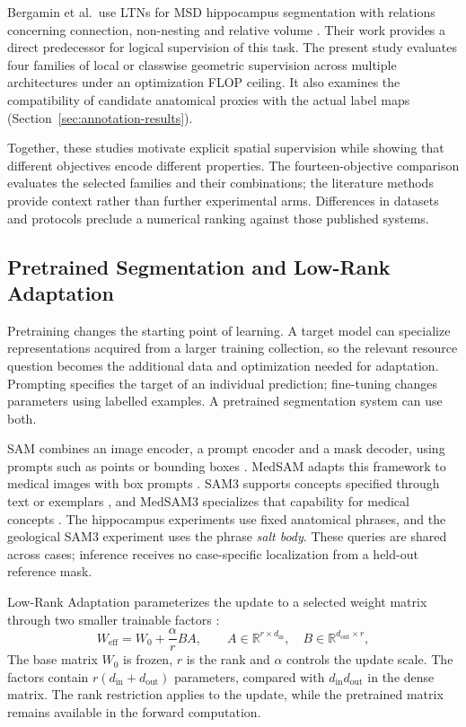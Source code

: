 \documentclass[12pt,a4paper]{article}
\begin{document}
Bergamin et al.\ use LTNs for MSD hippocampus segmentation with relations
concerning connection, non-nesting and relative volume
\cite{bergamin2025integrating}. Their work provides a direct predecessor
for logical supervision of this task. The present study evaluates four
families of local or classwise geometric supervision across multiple
architectures under an optimization FLOP ceiling. It also examines the
compatibility of candidate anatomical proxies with the actual label maps
(Section~\ref{sec:annotation-results}).

Together, these studies motivate explicit spatial supervision while
showing that different objectives encode different properties. The
fourteen-objective comparison evaluates the selected families and their
combinations; the literature methods provide context rather than further
experimental arms. Differences in datasets and protocols preclude a
numerical ranking against those published systems.

\subsection{Pretrained Segmentation and Low-Rank Adaptation}
\label{sec:pretrained-adaptation}

Pretraining changes the starting point of learning. A target model can
specialize representations acquired from a larger training collection,
so the relevant resource question becomes the additional data and
optimization needed for adaptation. Prompting specifies the target of
an individual prediction; fine-tuning changes parameters using labelled
examples. A pretrained segmentation system can use both.

SAM combines an image encoder, a prompt encoder and a mask decoder,
using prompts such as points or bounding boxes
\cite{kirillov2023segment}. MedSAM adapts this framework to medical
images with box prompts \cite{ma2024medsam}. SAM3 supports concepts
specified through text or exemplars \cite{carion2025sam3}, and MedSAM3
specializes that capability for medical concepts \cite{liu2025medsam3}.
The hippocampus experiments use fixed anatomical phrases, and the
geological SAM3 experiment uses the phrase \emph{salt body}. These queries
are shared across cases; inference receives no case-specific localization
from a held-out reference mask.

Low-Rank Adaptation parameterizes the update to a selected weight matrix
through two smaller trainable factors \cite{hu2021lora}:
\begin{equation}
W_{\mathrm{eff}}=W_0+\frac{\alpha}{r}BA,
\qquad
A\in\mathbb{R}^{r\times d_{\mathrm{in}}},\quad
B\in\mathbb{R}^{d_{\mathrm{out}}\times r},
\label{eq:lora-weight-update}
\end{equation}
The base matrix $W_0$ is frozen, $r$ is the rank and $\alpha$ controls
the update scale. The factors contain
$r(d_{\mathrm{in}}+d_{\mathrm{out}})$ parameters, compared with
$d_{\mathrm{in}}d_{\mathrm{out}}$ in the dense matrix. The rank restriction
applies to the update, while the pretrained matrix remains available
in the forward computation.
\end{document}
